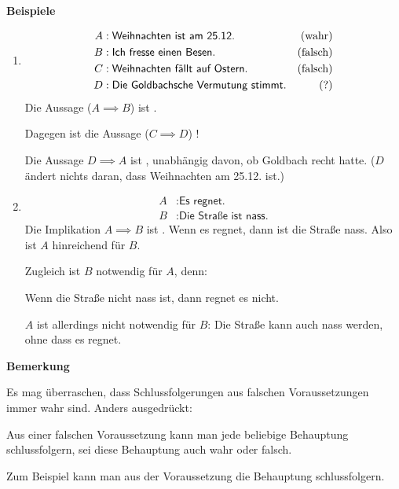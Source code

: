 \documentclass[a4paper,12pt,oneside,openany]{book}
\newenvironment{beispiele}[1][]{\vspace{2mm}\normalfont\normalsize \textbf{Beispiele}\ifthenelse{\equal{#1}{}}{:}{: #1}\begin{enumerate}[label=\arabic*)]}{\end{enumerate}}
\newenvironment{bemerkung}[1][]{\vspace{2mm}\normalfont\normalsize \textbf{Bemerkung}\ifthenelse{\equal{#1}{}}{:}{: #1}\newline\vspace{-8mm}\begin{addmargin}[5mm]{0cm}}{\end{addmargin}}
\newcommand{\überschrift}[1]{\subsubsection{#1}}
\begin{document}
\begin{beispiele}
	\item\mbox{}\vspace*{-1cm}\begin{align*}
		A & : \textsf{Weihnachten ist am 25.12.}          & (\textrm{wahr})   \\
		B & : \textsf{Ich fresse einen Besen.}            & (\textrm{falsch}) \\
		C & : \textsf{Weihnachten fällt auf Ostern.}      & (\textrm{falsch}) \\
		D & : \textsf{Die Goldbachsche Vermutung stimmt.} & (?)
	\end{align*}
	Die Aussage 
	(\(A \implies B\)) ist \falsch.

	Dagegen ist die Aussage 
	(\(C \implies D\)) \wahr!

	Die Aussage \(D \implies A\) ist \wahr, unabhängig davon, ob Goldbach recht hatte. (\(D\) ändert
	nichts daran, dass Weihnachten am 25.12. ist.)

	\item\mbox{}\vspace*{-1cm}\begin{align*}
		A & : \textsf{Es regnet.}           \\
		B & : \textsf{Die Straße ist nass.}
	\end{align*}
	Die Implikation \(A \implies B\) ist \wahr. Wenn es regnet, dann ist die Straße nass. Also
	ist \(A\) hinreichend für \(B\).

	Zugleich ist \(B\) notwendig für \(A\), denn:

	Wenn die Straße nicht nass ist, dann regnet es nicht.

	\(A\) ist allerdings nicht notwendig für \(B\): Die Straße kann auch nass werden, ohne dass
	es regnet.
\end{beispiele}

\begin{bemerkung}
	Es mag überraschen, dass Schlussfolgerungen aus falschen Voraussetzungen immer wahr sind.
	Anders ausgedrückt:

	Aus einer falschen Voraussetzung kann man jede beliebige Behauptung schlussfolgern, sei
	diese Behauptung auch wahr oder falsch.

	Zum Beispiel kann man aus der Voraussetzung  die Behauptung
	 schlussfolgern.
\end{bemerkung}
\end{document}
